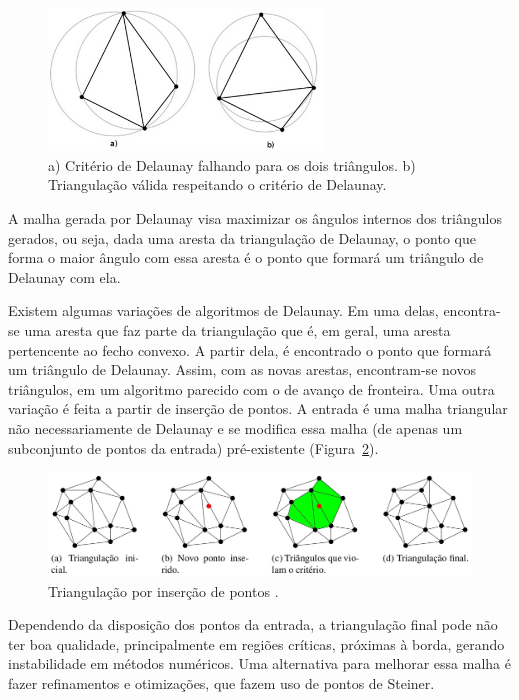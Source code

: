 \begin{figure}[htbp]
     \centering
     \includegraphics[width=0.65\textwidth]{fig/criterio_delaunay.jpg}
     \caption{a) Critério de Delaunay falhando para os dois triângulos. b) Triangulação válida respeitando o critério de Delaunay.} 
     \label{fig:criterio_delaunay}
 \end{figure}

A malha gerada por Delaunay visa maximizar os ângulos internos dos triângulos gerados, ou seja, dada uma aresta da triangulação de Delaunay, o ponto que forma o maior ângulo com essa aresta é o ponto que formará um triângulo de Delaunay com ela.

Existem algumas variações de algoritmos de Delaunay. Em uma delas, encontra-se uma aresta que faz parte da triangulação que é, em geral, uma aresta pertencente ao fecho convexo. A partir dela, é encontrado o ponto que formará um triângulo de Delaunay. Assim, com as novas arestas, encontram-se novos triângulos, em um algoritmo parecido com o de avanço de fronteira. Uma outra variação é feita a partir de inserção de pontos. A entrada é uma malha triangular não necessariamente de Delaunay e se modifica essa malha (de apenas um subconjunto de pontos da entrada) pré-existente (Figura~\ref{fig:triangulacao_insercao}).

\begin{figure}[htbp]
     \centering
     \includegraphics[width=1\textwidth]{fig/triangulacao_insercao.jpg}
     \caption{Triangulação por inserção de pontos \cite{bib:Freitas10}.} 
     \label{fig:triangulacao_insercao}
 \end{figure}

 Dependendo da disposição dos pontos da entrada, a triangulação final pode não ter boa qualidade, principalmente em regiões críticas, próximas à borda, gerando instabilidade em métodos numéricos. Uma alternativa para melhorar essa malha é fazer refinamentos e otimizações, que fazem uso de pontos de Steiner.


